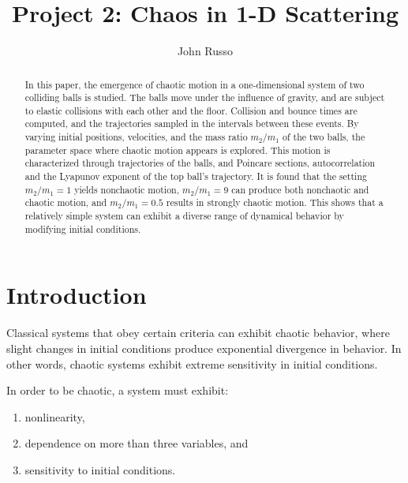 \documentclass[pra,twocolumn,showpacs,amsmath,amssymb, aps, 10pt]{revtex4-1}
\begin{document}
\title{Project 2: Chaos in 1-D Scattering}


\author{John Russo}

\begin{abstract}
  In this paper, the emergence of chaotic motion in a one-dimensional system of
  two colliding balls is studied. The balls
  move under the influence of gravity, and are subject to elastic collisions with each
  other and the floor. Collision and bounce times are computed, and the trajectories
  sampled in the intervals between these events. By varying initial positions,
  velocities, and the mass ratio $m_2/m_1$ of the two balls, the parameter space where chaotic motion
  appears is explored. This motion is characterized through trajectories of the balls,
  and
  Poincare sections, autocorrelation and the Lyapunov exponent of the top ball's trajectory.
  It is found that the setting $m_2/m_1=1$ yields nonchaotic motion, $m_2/m_1=9$
  can produce both nonchaotic and chaotic motion, and $m_2/m_1=0.5$ results in
  strongly chaotic motion. This shows that a relatively simple system can exhibit
  a diverse range of dynamical behavior by modifying initial conditions.
\end{abstract}



\maketitle

\section{Introduction} \label{sec:intro}

Classical systems that obey certain criteria can exhibit chaotic behavior, where
slight changes in initial conditions produce exponential divergence in behavior.
In other words, chaotic systems exhibit extreme sensitivity in initial
conditions.\cite{taylor}

In order to be chaotic, a system must exhibit:
\begin{enumerate}
  \item nonlinearity, \label{nonlinearity}
  \item dependence on more than three variables, and \label{dependence}
  \item sensitivity to initial conditions. \label{sensitivity}
\end{enumerate}
\end{document}
